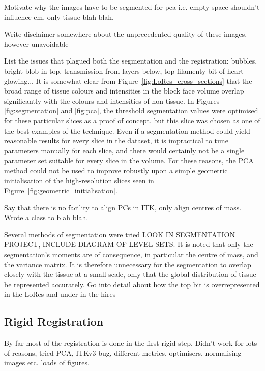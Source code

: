     Motivate why the images have to be segmented for pca i.e. empty space shouldn't influence cm, only tissue blah blah.
    
    Write disclaimer somewhere about the unprecedented quality of these images, however unavoidable 
    
    List the issues that plagued both the segmentation and the registration: bubbles, bright blob in top, transmission from layers below, top filamenty bit of heart glowing...
    It is somewhat clear from Figure~\ref{fig:LoRes_cross_sections} that the broad range of tissue colours and intensities in the block face volume overlap significantly with the colours and intensities of non-tissue. In Figures \ref{fig:segmentation} and \ref{fig:pca}, the threshold segmentation values were optimised for these particular slices as a proof of concept, but this slice was chosen as one of the best examples of the technique. Even if a segmentation method could yield reasonable results for every slice in the dataset, it is impractical to tune parameters manually for each slice, and there would certainly not be a single parameter set suitable for every slice in the volume. For these reasons, the PCA method could not be used to improve robustly upon a simple geometric initialisation of the high-resolution slices seen in Figure~\ref{fig:geometric_initialisation}.
    
    Say that there is no facility to align PCs in ITK, only align centres of mass. Wrote a class to blah blah.
    
    Several methods of segmentation were tried LOOK IN SEGMENTATION PROJECT, INCLUDE DIAGRAM OF LEVEL SETS. It is noted that only the segmentation's moments are of consequence, in particular the centre of mass, and the variance matrix. It is therefore unnecessary for the segmentation to overlap closely with the tissue at a small scale, only that the global distribution of tissue be represented accurately. Go into detail about how the top bit is overrepresented in the LoRes and under in the hires
        
  
  \subsection{Rigid Registration} %
  \label{sub:rigid_registration}
    By far most of the registration is done in the first rigid step. Didn't work for lots of reasons, tried PCA, ITKv3 bug, different metrics, optimisers, normalising images etc. loads of figures.
  
